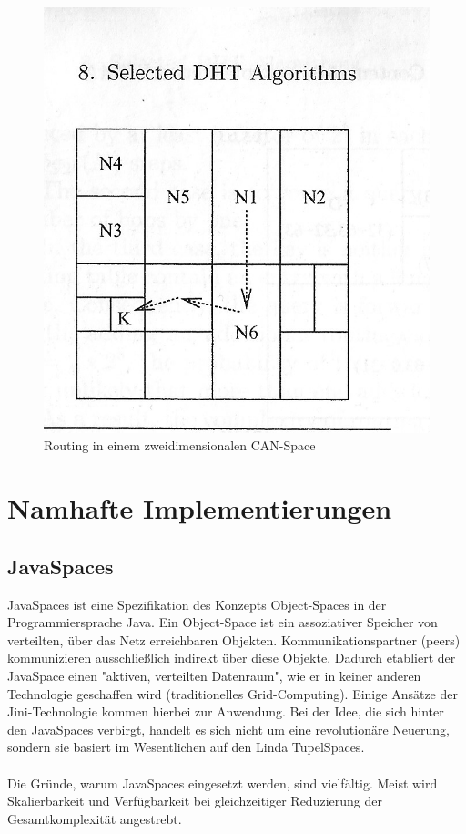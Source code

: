 \documentclass[a4paper,12pt]{scrreprt}
\begin{document}
					\begin{figure}
						\centering
						\includegraphics[width=0.55\linewidth]{./graphics/CAN_Routing}
						\caption{Routing in einem zweidimensionalen CAN-Space}
						\label{fig:CAN_Routing}
					\end{figure}
					 
\chapter{Namhafte Implementierungen}
	\section{JavaSpaces}
		JavaSpaces ist eine Spezifikation des Konzepts Object-Spaces in der Programmiersprache Java. Ein Object-Space ist ein assoziativer Speicher von verteilten, über das Netz erreichbaren Objekten. Kommunikationspartner (peers) kommunizieren ausschließlich indirekt über diese Objekte. Dadurch etabliert der JavaSpace einen "aktiven, verteilten Datenraum", wie er in keiner anderen Technologie geschaffen wird (traditionelles Grid-Computing). Einige Ansätze der Jini-Technologie kommen hierbei zur Anwendung. Bei der Idee, die sich hinter den JavaSpaces verbirgt, handelt es sich nicht um eine revolutionäre Neuerung, sondern sie basiert im Wesentlichen auf den Linda TupelSpaces.\\\\	
		Die Gründe, warum JavaSpaces eingesetzt werden, sind vielfältig. Meist wird Skalierbarkeit und Verfügbarkeit bei gleichzeitiger Reduzierung der Gesamtkomplexität angestrebt.
		
		
\end{document}
